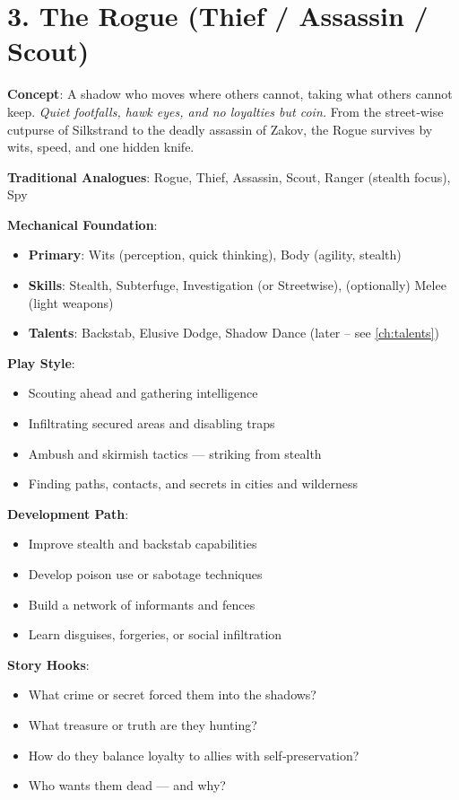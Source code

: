 \section{3. The Rogue (Thief / Assassin / Scout)}
\label{sec:concept-rogue}

\textbf{Concept}: A shadow who moves where others cannot, taking what others cannot keep. \emph{Quiet footfalls, hawk eyes, and no loyalties but coin.} From the street‑wise cutpurse of Silkstrand to the deadly assassin of Zakov, the Rogue survives by wits, speed, and one hidden knife.

\textbf{Traditional Analogues}: Rogue, Thief, Assassin, Scout, Ranger (stealth focus), Spy

\textbf{Mechanical Foundation}:
\begin{itemize}
\item \textbf{Primary}: Wits (perception, quick thinking), Body (agility, stealth)
\item \textbf{Skills}: Stealth, Subterfuge, Investigation (or Streetwise), (optionally) Melee (light weapons)
\item \textbf{Talents}: Backstab, Elusive Dodge, Shadow Dance (later – see \ref{ch:talents})
\end{itemize}

\textbf{Play Style}:
\begin{itemize}
\item Scouting ahead and gathering intelligence
\item Infiltrating secured areas and disabling traps
\item Ambush and skirmish tactics — striking from stealth
\item Finding paths, contacts, and secrets in cities and wilderness
\end{itemize}

\textbf{Development Path}:
\begin{itemize}
\item Improve stealth and backstab capabilities
\item Develop poison use or sabotage techniques
\item Build a network of informants and fences
\item Learn disguises, forgeries, or social infiltration
\end{itemize}

\textbf{Story Hooks}:
\begin{itemize}
\item What crime or secret forced them into the shadows?
\item What treasure or truth are they hunting?
\item How do they balance loyalty to allies with self‑preservation?
\item Who wants them dead — and why?
\end{itemize}

